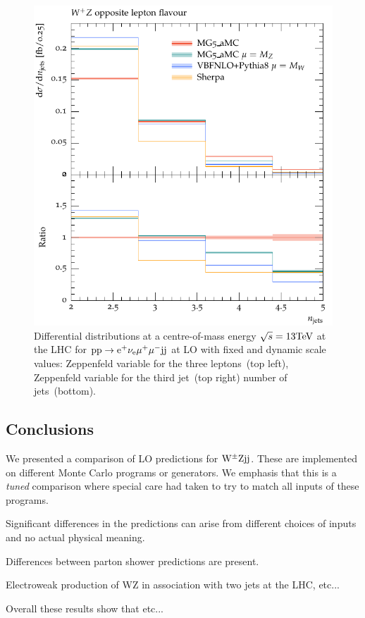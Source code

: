 \documentclass[11pt]{cernrep}
\begin{document}
\begin{figure}[htbp]
\begin{center}
   \includegraphics[scale=0.5]{figs/WpZ_OF_nJets}
\caption{Differential distributions at a centre-of-mass energy $\sqrt{s}=13{\rm TeV}$ at the LHC for ${\rm p} {\rm p} \to {\rm e}^+  \nu_{\rm e}  \mu^+ \mu^- {\rm j} {\rm j}$ at LO with fixed and dynamic scale values: 
                Zeppenfeld variable for the three leptons~(top left),
                Zeppenfeld variable for the third jet~(top right)
                number of jets~(bottom).}
\label{vbs_fig_shower_4b}
\end{center}
\end{figure}

\subsection{Conclusions \label{concl}}

We presented a comparison of LO predictions for ${\rm W}^{\pm}{\rm Z}{\rm j}{\rm j}$.
These are implemented on different Monte Carlo programs or generators.
We emphasis that this is a \emph{tuned} comparison where special care had taken to try to match all inputs of these programs.

Significant differences in the predictions can arise from different choices of inputs and no actual physical meaning.

Differences between parton shower predictions are present.

Electroweak production of WZ in association with two jets at the LHC, etc... 

Overall these results show that etc...


\end{document}
